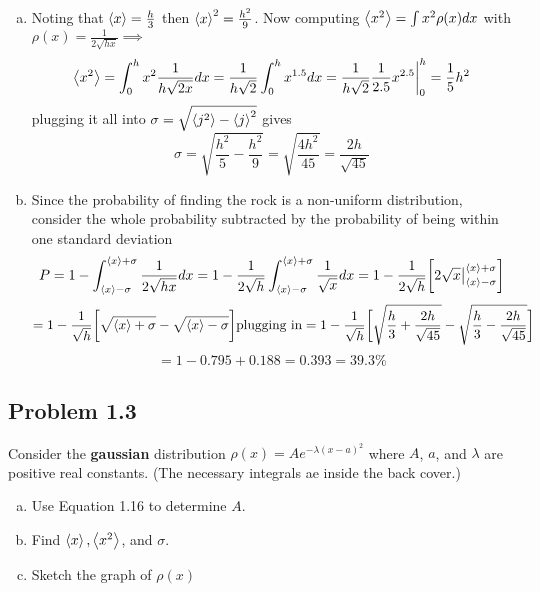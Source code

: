 \documentclass[12pt]{exam}
\begin{document}
\begin{solution}
    \begin{enumerate}[(a)]
        \item Noting that $\expval{x} = \frac{h}{3}$ then $\expval{x}^2 = \frac{h^2}{9}$. Now computing $\expval{x^2} = \int x^2\rho (x)dx$ with $\rho(x) = \frac{1}{2\sqrt{hx}} \implies$
        $$\expval{x^2} = \int^h_0 x^2 \frac{1}{h\sqrt{2x}} dx = \frac{1}{h\sqrt{2}} \int^h_0 x^{1.5}dx =  \frac{1}{h\sqrt{2}} \frac{1}{2.5} x^{2.5} \bigg|^h_0 = \frac{1}{5}h^2$$ plugging it all into $\sigma = \sqrt{\expval{j^2}-\expval{j}^2}$  gives 
        $$\sigma = \sqrt{\frac{h^2}{5}-\frac{h^2}{9}} = \sqrt{\frac{4h^2}{45}} = \frac{2h}{\sqrt{45}}$$

        \item Since the probability of finding the rock is a non-uniform distribution, consider the whole probability subtracted by the probability of being within one standard deviation 
        $$P = 1 - \int^{\expval{x}+\sigma}_{\expval{x}-\sigma} \frac{1}{2\sqrt{hx}}dx = 1-  \frac{1}{2\sqrt{h}}\int^{\expval{x}+\sigma}_{\expval{x}-\sigma} \frac{1}{\sqrt{x}}dx = 1- \frac{1}{2\sqrt{h}}\bigg[2\sqrt{x}\big|^{\expval{x}+\sigma}_{\expval{x}-\sigma}\bigg]$$
        $$=  1- \frac{1}{\sqrt{h}}\bigg[ \sqrt{\expval{x}+\sigma} - \sqrt{\expval{x}-\sigma}\bigg] \text{plugging in} = 1 - \frac{1}{\sqrt{h}}\bigg[ \sqrt{\frac{h}{3}+\frac{2h}{\sqrt{45}}} - \sqrt{\frac{h}{3}-\frac{2h}{\sqrt{45}}}\bigg]$$
        $$ = 1 - 0.795 + 0.188 = 0.393 = 39.3\%$$
    \end{enumerate}
\end{solution}



\subsection*{Problem 1.3}
Consider the \textbf{gaussian} distribution $\rho(x) = Ae^{-\lambda(x-a)^2}$ where $A$, $a$, and $\lambda$ are positive real constants. (The necessary integrals ae inside the back cover.)
\begin{enumerate}[(a)]
    \item Use Equation 1.16 to determine $A$.
    \item Find $\expval{x}, \expval{x^2}$, and $\sigma$.
    \item Sketch the graph of $\rho(x)$
\end{enumerate}
\end{document}

